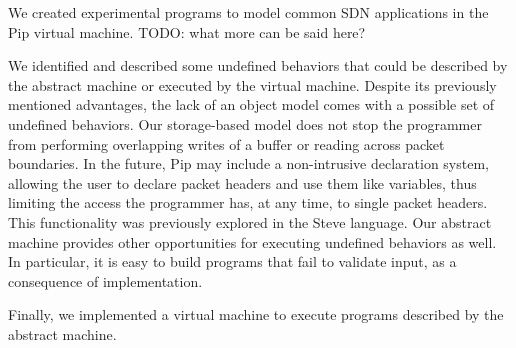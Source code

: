 We created experimental programs to model common SDN applications in the Pip virtual machine. TODO: what more can be said here?

We identified and described some undefined behaviors that could be described by the abstract machine or executed by the virtual machine. Despite its previously mentioned advantages, the lack of an object model comes with a possible set of undefined behaviors. Our storage-based model does not stop the programmer from performing overlapping writes of a buffer or reading across packet boundaries. In the future, Pip may include a non-intrusive declaration system, allowing the user to declare packet headers and use them like variables, thus limiting the access the programmer has, at any time, to single packet headers. This functionality was previously explored in the Steve language. Our abstract machine provides other opportunities for executing undefined behaviors as well. In particular, it is easy to build programs that fail to validate input, as a consequence of implementation.

Finally, we implemented a virtual machine to execute programs described by the abstract machine. 








